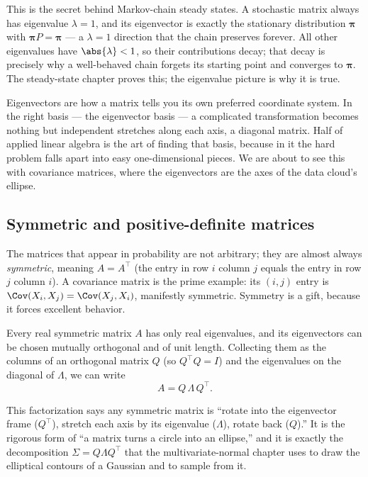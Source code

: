 This is the secret behind Markov-chain steady states. A stochastic matrix always has eigenvalue
$\lambda=1$, and its eigenvector is exactly the stationary distribution $\boldsymbol\pi$ with
$\boldsymbol\pi P=\boldsymbol\pi$ --- a $\lambda=1$ direction that the chain preserves forever. All
other eigenvalues have $\abs{\lambda}<1$, so their contributions decay; that decay is precisely why a
well-behaved chain forgets its starting point and converges to $\boldsymbol\pi$. The
steady-state chapter proves this; the eigenvalue picture is why it is true.

\begin{aestheticbox}
Eigenvectors are how a matrix tells you its own preferred coordinate system. In the right basis ---
the eigenvector basis --- a complicated transformation becomes nothing but independent stretches along
each axis, a diagonal matrix. Half of applied linear algebra is the art of finding that basis, because
in it the hard problem falls apart into easy one-dimensional pieces. We are about to see this with
covariance matrices, where the eigenvectors are the axes of the data cloud's ellipse.
\end{aestheticbox}

\subsection{Symmetric and positive-definite matrices}
\label{chAcla:posdef}

The matrices that appear in probability are not arbitrary; they are almost always \emph{symmetric},
meaning $A=A^\top$ (the entry in row $i$ column $j$ equals the entry in row $j$ column $i$). A
covariance matrix is the prime example: its $(i,j)$ entry is $\Cov(X_i,X_j)=\Cov(X_j,X_i)$, manifestly
symmetric. Symmetry is a gift, because it forces excellent behavior.

\begin{theorem}
\label{chAcla:thm-spectral}
Every real symmetric matrix $A$ has only real eigenvalues, and its eigenvectors can be chosen mutually
orthogonal and of unit length. Collecting them as the columns of an orthogonal matrix $Q$ (so
$Q^\top Q = I$) and the eigenvalues on the diagonal of $\Lambda$, we can write
\[
  A = Q\,\Lambda\,Q^\top.
\]
\end{theorem}

This factorization says any symmetric matrix is ``rotate into the eigenvector frame ($Q^\top$), stretch
each axis by its eigenvalue ($\Lambda$), rotate back ($Q$).'' It is the rigorous form of ``a matrix
turns a circle into an ellipse,'' and it is exactly the decomposition $\Sigma = Q\Lambda Q^\top$ that
the multivariate-normal chapter uses to draw the elliptical contours of a Gaussian and to sample from
it.


